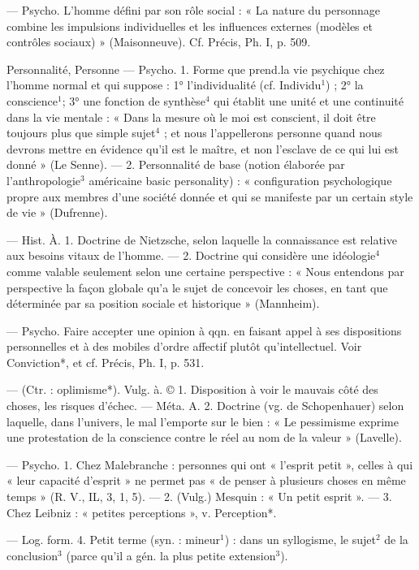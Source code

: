 \begin{itemize}[leftmargin=1cm, label=, itemsep=1pt]
 — Psycho. L'homme défini par son rôle social : « La nature
du personnage combine les impulsions individuelles et les influences
externes (modèles et contrôles sociaux) » (Maisonneuve). Cf. Précis,
Ph. I, p. 509.

Personnalité, Personne\ib{} — Psycho.
1. Forme que prend.la vie psychique
chez l'homme normal et qui suppose : 1° l’individualité (cf. Individu$^1$) ; 2° la conscience$^1$; 3° une
fonction de synthèse$^4$ qui établit une
unité et une continuité dans la vie
mentale : « Dans la mesure où le moi
est conscient, il doit être toujours
plus que simple sujet$^4$ ; et nous l’appellerons personne quand nous devrons mettre en évidence qu'il est
le maître, et non l’esclave de ce qui
lui est donné » (Le Senne). — 2. Personnalité
de base (notion élaborée
par l'anthropologie$^3$ américaine
basic personality) : « configuration
psychologique propre aux membres
d’une société donnée et qui se manifeste par un certain style de vie »
(Dufrenne).

 — Hist. À. 1. Doctrine
de Nietzsche, selon laquelle la
connaissance est relative aux besoins
vitaux de l’homme. — 2. Doctrine qui
considère une idéologie$^4$ comme
valable seulement selon une certaine perspective : « Nous entendons
par perspective la façon globale qu’a
le sujet de concevoir les choses, en
tant que déterminée par sa position
sociale et historique » (Mannheim).

 — Psycho. Faire accepter
une opinion à qqn. en faisant appel
à ses dispositions personnelles et à
des mobiles d’ordre affectif plutôt
qu'intellectuel. Voir Conviction*, et
cf. Précis, Ph. I, p. 531.

 — (Ctr. : oplimisme*).
Vulg. à. © 1. Disposition à voir le
mauvais côté des choses, les risques
d'échec. — Méta. A. 2. Doctrine
(vg. de Schopenhauer) selon laquelle,
dans l’univers, le mal l’emporte sur
le bien : « Le pessimisme exprime
une protestation de la conscience
contre le réel au nom de la valeur »
(Lavelle).

 — Psycho. 1. Chez Malebranche :
personnes qui ont « l'esprit petit »,
celles à qui « leur capacité d’esprit »
ne permet pas « de penser à plusieurs choses en même temps »
(R. V., IL, 3, 1, 5). — 2. (Vulg.)
Mesquin : « Un petit esprit ». — 3.
Chez Leibniz : « petites perceptions »,
v. Perception*.

— Log. form. 4. Petit terme (syn. :
mineur$^1$) : dans un syllogisme, le
sujet$^2$ de la conclusion$^3$ (parce qu’il
a gén. la plus petite extension$^3$).


\end{itemize}
